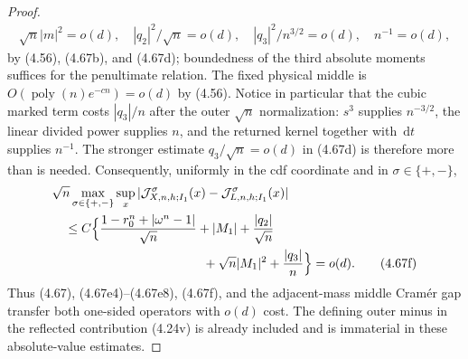 \documentclass[11pt,a4paper]{article}
\numberwithin{equation}{section}
\theoremstyle{definition}
\theoremstyle{remark}
\newcommand{\dd}{\,\mathrm d}
\begin{document}
\begin{proof}
\[\begin{gathered}
 \sqrt n|m|^2=o(d),\quad |q_2|^2/\sqrt n=o(d),\quad
 |q_3|^2/n^{3/2}=o(d),\quad n^{-1}=o(d),              \tag{4.67e11}
\end{gathered}
\]
by (4.56), (4.67b), and (4.67d); boundedness of the third absolute
moments suffices for the penultimate relation.  The fixed physical
middle is \(O(\operatorname {poly}(n)e^{-cn})=o(d)\) by (4.56).
Notice in particular that the cubic marked term costs $|q_3|/n$ after
the outer $\sqrt n$ normalization: $s^3$ supplies $n^{-3/2}$, the
linear divided power supplies $n$, and the returned kernel together with
$\dd t$ supplies $n^{-1}$.  The stronger estimate
$q_3/\sqrt n=o(d)$ in (4.67d) is therefore more than is needed.
Consequently,
uniformly in the cdf coordinate and in $\sigma\in\{+,-\}$,
\begin{align}
 &\sqrt n\max_{\sigma\in\{+,-\}}\sup_x
 |\mathcal J^\sigma_{X,n,h;I_1}(x)
       -\mathcal J^\sigma_{L,n,h;I_1}(x)|                         \notag\\
 &\quad\le C\Big\{{1-r_0^n+|\omega^n-1|\over\sqrt n}+|M_1|
       +{|q_2|\over\sqrt n}                            \notag\\
 &\hspace{42mm}+\sqrt n|M_1|^2+{|q_3|\over n}\Big\}
 =o(d).                                                \tag{4.67f}
\end{align}
Thus (4.67), (4.67e4)--(4.67e8), (4.67f), and the adjacent-mass middle
Cram\'er gap transfer both one-sided operators with $o(d)$ cost.  The
defining outer minus in the reflected contribution (4.24v) is already
included and is immaterial in these absolute-value estimates.


\end{proof}
\end{document}
